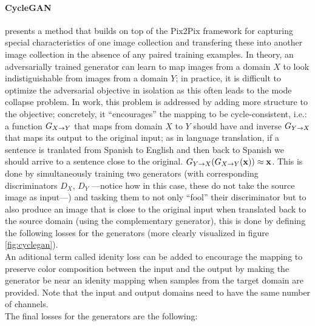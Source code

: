 \documentclass[../main.tex]{subfiles}
\begin{document}
\paragraph{CycleGAN}
\parencite{Zhu2017a} presents a method that builds on top of the Pix2Pix framework
for capturing special characteristics of one
image collection and transfering these into another image collection in the
absence of any paired training examples.
In theory, an adversarially trained generator can learn to map images from
a domain $X$ to look indistiguishable from images from a domain $Y$; 
in practice, it is difficult to optimize the adversarial objective in isolation
as this often leads to the mode collapse problem.
In \cite{Zhu2017a} work, this problem is addressed by adding more structure to the
objective; concretely, it ``encourages'' the mapping to be cycle-consistent, i.e.:
a function $G_{X \rightarrow Y}$ that maps from domain $X$ to $Y$ should have and
inverse $G_{Y \rightarrow X}$ that maps its output to the original input; as in
language translation, if a sentence is tranlated from Spanish to English and
then back to Spanish we should arrive to a sentence close to the original.
$ G_{Y \rightarrow X}(G_{X \rightarrow Y}(\mathbf{x})) \approx \mathbf{x} $.
This is done by simultaneously training two generators (with corresponding
discriminators $D_X$, $D_Y$ ---notice how in this case, these do not take the
source image as input---) and tasking them to not only ``fool'' their
discriminator but to also produce an image that is close to the original input
when translated back to the source domain (using the complementary generator),
this is done by defining the following losses for the generators
(more clearly visualized in figure \ref{fig:cyclegan}).\\
An aditional term called
idenity loss can be added to encourage the mapping to preserve color composition
between the input and the output by making the generator be near an idenity
mapping when samples from the target domain are provided.
Note that the input and output domains need to have the same number of channels.\\ The final losses for the generators are the following:
\end{document}
